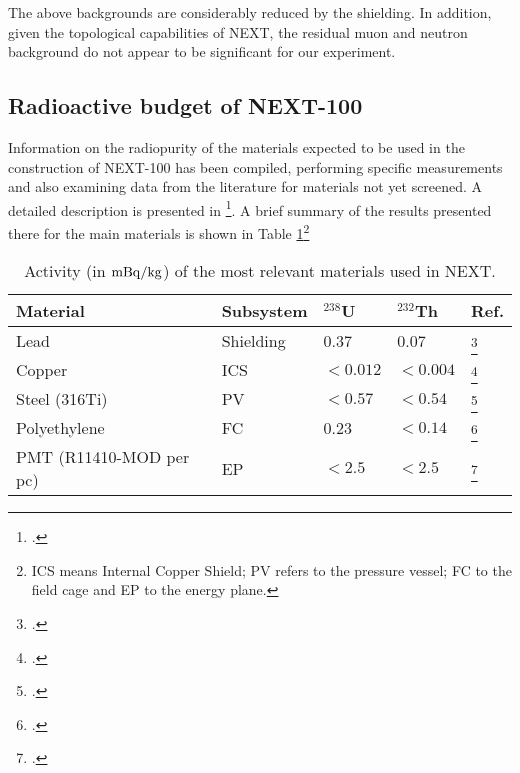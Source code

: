 The above backgrounds are considerably reduced by the shielding. In addition, given the topological capabilities of NEXT, the residual muon and neutron background do not appear to be significant
for our experiment. 


\subsection{Radioactive budget of NEXT-100}\label{sec:rabudget}

Information on the radiopurity of the materials expected to be used in
the construction of NEXT-100 has been compiled, performing specific
measurements and also examining data from the literature for materials
not yet screened. A detailed description is presented in \footcite{Alvarez:2012as}. A brief summary of the results presented there for the main materials is shown in Table \ref{tab:RA}\footnote{ICS means Internal Copper Shield; PV refers to the pressure vessel; FC to the field cage and EP to the energy plane.}
\begin{table}
\caption{Activity (in ${\rm mBq}/{\rm kg}$) of the most relevant materials used in NEXT.} \label{tab:RA}
\begin{center}
\begin{tabular}{lllll}
\hline
Material & Subsystem &$^{238}$U & $^{232}$Th & Ref. \\  
\hline
Lead  & Shielding & 0.37 & 0.07  & \footcite{Alvarez:2012as}\\

Copper & ICS & $<0.012$ & $<0.004$  & \footcite{Alvarez:2012as}\\

Steel (316Ti) & PV  & $<0.57$ & $<0.54$  & \footcite{Alvarez:2012as}\\

Polyethylene & FC &  0.23 & $<0.14$ & \footcite{Aprile:2011ru} \\

PMT (R11410-MOD per pc) & EP &  $< 2.5$ & $< 2.5$ & \footcite{Aprile:2011ru} \\
\hline

\end{tabular}  
\end{center}
\end{table} 


